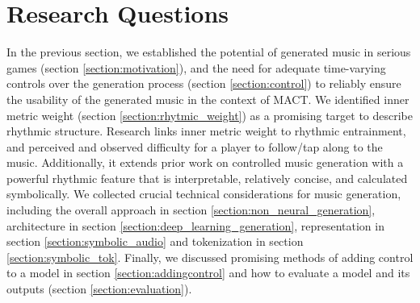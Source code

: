 

\chapter{Research Questions}
\label{chap:researchquestions}
\pagestyle{fancy}

In the previous section, we established the potential of generated music in serious games (section \ref{section:motivation}), and the need for adequate time-varying controls over the generation process (section \ref{section:control}) to reliably ensure the usability of the generated music in the context of MACT. We identified inner metric weight (section \ref{section:rhytmic_weight}) as a promising target to describe rhythmic structure. Research links inner metric weight to rhythmic entrainment, and perceived and observed difficulty for a player to follow/tap along to the music. Additionally, it extends prior work on controlled music generation with a powerful rhythmic feature that is interpretable, relatively concise, and calculated symbolically. 
We collected crucial technical considerations for music generation, including the overall approach in section \ref{section:non_neural_generation}, architecture in section \ref{section:deep_learning_generation}, representation in section \ref{section:symbolic_audio} and tokenization in section \ref{section:symbolic_tok}. Finally, we discussed promising methods of adding control to a model in section \ref{section:addingcontrol} and how to evaluate a model and its outputs (section \ref{section:evaluation}). 

